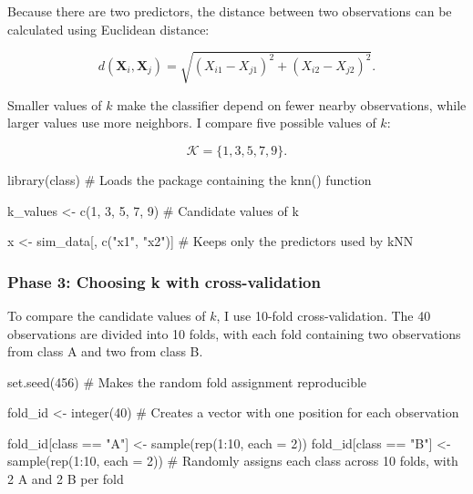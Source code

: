 \documentclass[
  letterpaper,
  DIV=11,
  numbers=noendperiod]{scrreprt}
\newenvironment{Shaded}{\begin{snugshade}}{\end{snugshade}}
\newcommand{\AttributeTok}[1]{\textcolor[rgb]{0.40,0.45,0.13}{#1}}
\newcommand{\CommentTok}[1]{\textcolor[rgb]{0.37,0.37,0.37}{#1}}
\newcommand{\DecValTok}[1]{\textcolor[rgb]{0.68,0.00,0.00}{#1}}
\newcommand{\FunctionTok}[1]{\textcolor[rgb]{0.28,0.35,0.67}{#1}}
\newcommand{\NormalTok}[1]{\textcolor[rgb]{0.00,0.23,0.31}{#1}}
\newcommand{\OtherTok}[1]{\textcolor[rgb]{0.00,0.23,0.31}{#1}}
\newcommand{\SpecialCharTok}[1]{\textcolor[rgb]{0.37,0.37,0.37}{#1}}
\newcommand{\StringTok}[1]{\textcolor[rgb]{0.13,0.47,0.30}{#1}}
\begin{document}
Because there are two predictors, the distance between two observations
can be calculated using Euclidean distance:

\[
d(\mathbf{X}_i,\mathbf{X}_j)
=
\sqrt{(X_{i1}-X_{j1})^2 + (X_{i2}-X_{j2})^2}.
\]

Smaller values of \(k\) make the classifier depend on fewer nearby
observations, while larger values use more neighbors. I compare five
possible values of \(k\):

\[
\mathcal{K} = \{1,3,5,7,9\}.
\]

\begin{Shaded}
\begin{Highlighting}[]
\FunctionTok{library}\NormalTok{(class) }\CommentTok{\# Loads the package containing the knn() function}

\NormalTok{k\_values }\OtherTok{\textless{}{-}} \FunctionTok{c}\NormalTok{(}\DecValTok{1}\NormalTok{, }\DecValTok{3}\NormalTok{, }\DecValTok{5}\NormalTok{, }\DecValTok{7}\NormalTok{, }\DecValTok{9}\NormalTok{) }\CommentTok{\# Candidate values of k}

\NormalTok{x }\OtherTok{\textless{}{-}}\NormalTok{ sim\_data[, }\FunctionTok{c}\NormalTok{(}\StringTok{"x1"}\NormalTok{, }\StringTok{"x2"}\NormalTok{)] }\CommentTok{\# Keeps only the predictors used by kNN}
\end{Highlighting}
\end{Shaded}

\subsubsection{Phase 3: Choosing k with
cross-validation}\label{phase-3-choosing-k-with-cross-validation}

To compare the candidate values of \(k\), I use 10-fold
cross-validation. The 40 observations are divided into 10 folds, with
each fold containing two observations from class A and two from class B.

\begin{Shaded}
\begin{Highlighting}[]
\FunctionTok{set.seed}\NormalTok{(}\DecValTok{456}\NormalTok{) }\CommentTok{\# Makes the random fold assignment reproducible}

\NormalTok{fold\_id }\OtherTok{\textless{}{-}} \FunctionTok{integer}\NormalTok{(}\DecValTok{40}\NormalTok{) }\CommentTok{\# Creates a vector with one position for each observation}

\NormalTok{fold\_id[class }\SpecialCharTok{==} \StringTok{"A"}\NormalTok{] }\OtherTok{\textless{}{-}} \FunctionTok{sample}\NormalTok{(}\FunctionTok{rep}\NormalTok{(}\DecValTok{1}\SpecialCharTok{:}\DecValTok{10}\NormalTok{, }\AttributeTok{each =} \DecValTok{2}\NormalTok{))}
\NormalTok{fold\_id[class }\SpecialCharTok{==} \StringTok{"B"}\NormalTok{] }\OtherTok{\textless{}{-}} \FunctionTok{sample}\NormalTok{(}\FunctionTok{rep}\NormalTok{(}\DecValTok{1}\SpecialCharTok{:}\DecValTok{10}\NormalTok{, }\AttributeTok{each =} \DecValTok{2}\NormalTok{))}
\CommentTok{\# Randomly assigns each class across 10 folds, with 2 A and 2 B per fold}
\end{Highlighting}
\end{Shaded}
\end{document}
